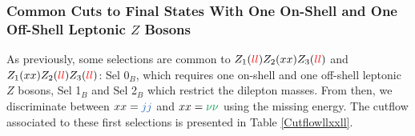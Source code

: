 \documentclass[a4paper,11pt]{article}
\begin{document}
    \subsubsection[Common Cuts to Final States With One On-Shell and One Off-Shell Leptonic $Z$ Bosons]{Common Cuts to Final States With One On-Shell and One Off-Shell Leptonic \boldmath$Z$ Bosons}
    As previously, some selections are common to $Z_1(\textcolor{red}{ll})Z_2(xx)Z_3(\textcolor{red}{ll})$ and $Z_1(xx)Z_2(\textcolor{red}{ll})Z_3(\textcolor{red}{ll})$: Sel 0$_B$, which requires one on-shell and one off-shell leptonic $Z$ bosons, Sel 1$_B$ and Sel 2$_B$ which restrict the dilepton masses. From then, we discriminate between $xx=\textcolor{NavyBlue}{jj}$ and $xx=\textcolor{Green}{\nu\nu}$ using the missing energy.
    The cutflow associated to these first selections is presented in Table \ref{Cutflowllxxll}.
\end{document}
